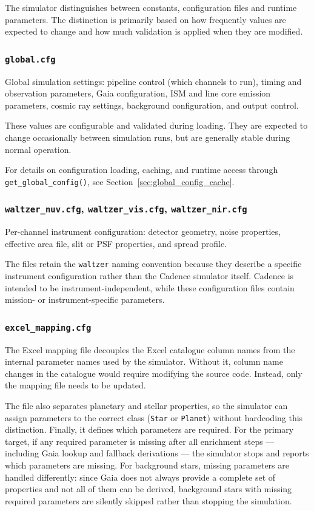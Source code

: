 The simulator distinguishes between constants, configuration files and runtime parameters. The distinction is primarily based on how frequently values are expected to change and how much validation is applied when they are modified.

\subsubsection{\texttt{global.cfg}}
\label{sec:global_cfg}
Global simulation settings: pipeline control (which channels to run), timing and observation parameters, Gaia configuration, ISM and line core emission parameters, cosmic ray settings, background configuration, and output control.

These values are configurable and validated during loading. They are expected to change occasionally between simulation runs, but are generally stable during normal operation.

For details on configuration loading, caching, and runtime access through \texttt{get\_global\_config()}, see Section~\ref{sec:global_config_cache}.

\subsubsection{\texttt{waltzer\_nuv.cfg}, \texttt{waltzer\_vis.cfg}, \texttt{waltzer\_nir.cfg}}
\label{sec:channel_cfg}
Per-channel instrument configuration: detector geometry, noise properties, effective area file, slit or PSF properties, and spread profile.

The files retain the \texttt{waltzer} naming convention because they describe a specific instrument configuration rather than the Cadence simulator itself. Cadence is intended to be instrument-independent, while these configuration files contain mission- or instrument-specific parameters.

\subsubsection{\texttt{excel\_mapping.cfg}}
\label{sec:excel_mapping}
The Excel mapping file decouples the Excel catalogue column names from the internal parameter names used by the simulator. Without it, column name changes in the catalogue would require modifying the source code. Instead, only the mapping file needs to be updated.

The file also separates planetary and stellar properties, so the simulator can assign parameters to the correct class (\texttt{Star} or \texttt{Planet}) without hardcoding this distinction. Finally, it defines which parameters are required. For the primary target, if any required parameter is missing after all enrichment steps — including Gaia lookup and fallback derivations — the simulator stops and reports which parameters are missing. For background stars, missing parameters are handled differently: since Gaia does not always provide a complete set of properties and not all of them can be derived, background stars with missing required parameters are silently skipped rather than stopping the simulation.


